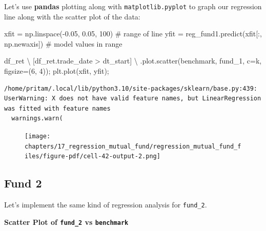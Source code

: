 \documentclass[
  letterpaper,
  DIV=11,
  numbers=noendperiod]{scrreprt}
\newenvironment{Shaded}{\begin{snugshade}}{\end{snugshade}}
\newcommand{\CommentTok}[1]{\textcolor[rgb]{0.37,0.37,0.37}{#1}}
\newcommand{\DecValTok}[1]{\textcolor[rgb]{0.68,0.00,0.00}{#1}}
\newcommand{\FloatTok}[1]{\textcolor[rgb]{0.68,0.00,0.00}{#1}}
\newcommand{\NormalTok}[1]{\textcolor[rgb]{0.00,0.23,0.31}{#1}}
\newcommand{\OperatorTok}[1]{\textcolor[rgb]{0.37,0.37,0.37}{#1}}
\newcommand{\StringTok}[1]{\textcolor[rgb]{0.13,0.47,0.30}{#1}}
\begin{document}
Let's use \textbf{pandas} plotting along with \texttt{matplotlib.pyplot}
to graph our regression line along with the scatter plot of the data:

\begin{Shaded}
\begin{Highlighting}[]
\NormalTok{xfit }\OperatorTok{=}\NormalTok{ np.linspace(}\OperatorTok{{-}}\FloatTok{0.05}\NormalTok{, }\FloatTok{0.05}\NormalTok{, }\DecValTok{100}\NormalTok{)           }\CommentTok{\# range of line}
\NormalTok{yfit }\OperatorTok{=}\NormalTok{ reg\_fund1.predict(xfit[:, np.newaxis])  }\CommentTok{\# model values in range}


\NormalTok{df\_ret }\OperatorTok{\textbackslash{}}
\NormalTok{    [df\_ret.trade\_date }\OperatorTok{\textgreater{}}\NormalTok{ dt\_start] }\OperatorTok{\textbackslash{}}
\NormalTok{    .plot.scatter(}\StringTok{\textquotesingle{}benchmark\textquotesingle{}}\NormalTok{, }\StringTok{\textquotesingle{}fund\_1\textquotesingle{}}\NormalTok{, c}\OperatorTok{=}\StringTok{\textquotesingle{}k\textquotesingle{}}\NormalTok{, figsize}\OperatorTok{=}\NormalTok{(}\DecValTok{6}\NormalTok{, }\DecValTok{4}\NormalTok{))}\OperatorTok{;}
\NormalTok{plt.plot(xfit, yfit)}\OperatorTok{;}
\end{Highlighting}
\end{Shaded}

\begin{verbatim}
/home/pritam/.local/lib/python3.10/site-packages/sklearn/base.py:439: UserWarning: X does not have valid feature names, but LinearRegression was fitted with feature names
  warnings.warn(
\end{verbatim}

\begin{figure}[H]

{\centering \texttt{[image: chapters/17\_regression\_mutual\_fund/regression\_mutual\_fund\_files/figure-pdf/cell-42-output-2.png]}

}

\end{figure}

\hypertarget{fund-2}{%
\subsection{Fund 2}\label{fund-2}}

Let's implement the same kind of regression analysis for
\texttt{fund\_2}.

\textbf{Scatter Plot of \texttt{fund\_2} vs \texttt{benchmark}}
\end{document}
